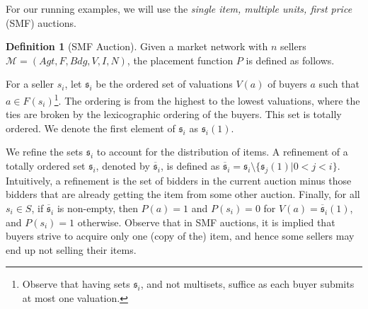 \documentclass[letterpaper]{article} %
\theoremstyle{definition}
\newtheorem{definition}{Definition}
\begin{document}


For our running examples, we will use the \emph{single item, multiple units, first price} (SMF) auctions.
\begin{definition}[SMF Auction]
\label{def:SMF}
  Given a market network with $n$ sellers  $\mathcal{M} = (Agt, F, Bdg, V, I, N)$, the placement function $P$ is defined as follows.

  For a seller $s_i$, let $\mathfrak{s}_i$ be the ordered set of valuations $V(a)$ of buyers $a$ such that $a \in F(s_i)$\footnote{Observe that having sets $\mathfrak{s}_i$, and not multisets,  suffice as each buyer submits at most one valuation.}. The ordering is from the highest to the lowest valuations, where the ties are broken by the lexicographic ordering of the buyers. %
  This set is totally ordered. We denote the first element of $\mathfrak{s}_i$ as $\mathfrak{s}_i (1)$.

  We refine the sets $\mathfrak{s}_i$ to account for the distribution of items. A refinement of a totally ordered set $\mathfrak{s}_i$, denoted by $\overline{\mathfrak{s}}_i$, is defined as $\overline{\mathfrak{s}}_i = \mathfrak{s}_i \setminus \{\mathfrak{s}_j (1)| 0 < j < i\}$. Intuitively, a refinement is the set of bidders in the current auction minus those bidders that are already getting the item from some other auction.  
Finally, for all $s_i \in S$, if $\overline{\mathfrak{s}}_i$ is non-empty, then $P(a) = 1$ and $P(s_i) = 0$ for $V(a) = \overline{\mathfrak{s}}_i (1)$, and $P(s_i) = 1$ otherwise. Observe that in SMF auctions, it is implied that buyers strive to acquire only one (copy of the) item, and hence some sellers may end up not selling their items.


\end{definition}
\end{document}
